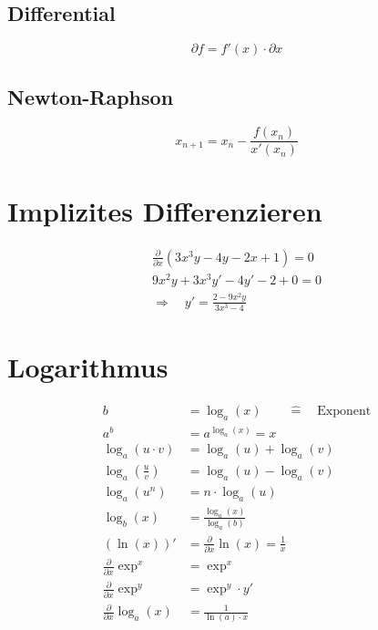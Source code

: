 \subsection{Differential}
\begin{equation}
\partial f = f'(x) \cdot \partial x
\end{equation}

\subsection{Newton-Raphson}
\begin{equation}
x_{n+1} = x_n - \frac{f(x_n)}{x'(x_n)}
\end{equation}

\section{Implizites Differenzieren}
\begin{gather*}
\frac{\partial}{\partial x}\left(3x^3y - 4y - 2x + 1\right) = 0 \\
9x^2y + 3x^3y' - 4y' - 2 + 0 = 0 \\
\Longrightarrow \quad y' = \frac{2 - 9x^2y}{3x^3-4}
\end{gather*}


\section{Logarithmus}
\begin{align}
  b &= \log_a(x) \qquad \hat{=} \quad \text{Exponent} \\
  a^b &= a^{\log_a(x)} = x \\
  \log_a(u\cdot v) &= \log_a(u) + \log_a(v) \\
  \log_a\left(\frac{u}{v}\right) &= \log_a(u) - \log_a(v) \\
  \log_a\left(u^n\right) &= n \cdot \log_a(u) \\
  \log_b(x) &= \frac{\log_a(x)}{\log_a(b)} \\
  {\left(\ln(x)\right)}' &= \frac{\partial}{\partial x}\ln(x) = \frac{1}{x} \\
  \frac{\partial}{\partial x}\exp^x &= \exp^x \\
  \frac{\partial}{\partial x}\exp^y &= \exp^y \cdot y' \\
  \frac{\partial}{\partial x}\log_a(x) &= \frac{1}{\ln(a) \cdot x}
\end{align}


